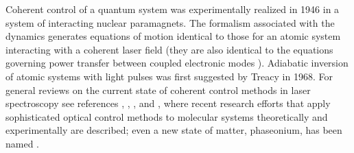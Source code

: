 Coherent control of a quantum system was experimentally realized in 1946 \cite{Bloch:1946a} in a system of interacting nuclear paramagnets. The formalism associated with the dynamics \cite{Pake:1962a} generates equations of motion identical to those for an atomic system interacting with a coherent laser field \cite{Cohen:1977a,Ebery:1977a} (they are also identical to the equations governing power transfer between coupled electronic modes \cite{Louisell:1960a}). Adiabatic inversion of atomic systems with light pulses was first suggested by Treacy \cite{Treacy:1968a} in 1968. For general reviews on the current state of coherent control methods in laser spectroscopy see references \cite{Hansch:1999a}, \cite{Arimondo:1996a}, \cite{Rabitz:2000a}, and \cite{Harris:1997a}, where recent research efforts that apply sophisticated optical control methods to molecular systems theoretically \cite{Bergmann:1998a,Shore:1995a,Danileiko:1994a,Harris:1990a,Cao:1998a,Rabitz:1988a,Rabitz:1992a,Wu:1994a} and experimentally \cite{Harris:1990a,Weinacht:2001a,Qi:2002a,Schmitt:1997a} are described; even a new state of matter, phaseonium, has been named \cite{Scully:1992a,Wojcik:1997a}.

